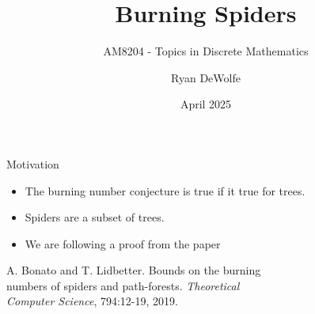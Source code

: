 \documentclass{beamer}
\title{Burning Spiders}
\subtitle{AM8204 - Topics in Discrete Mathematics}
\author{Ryan DeWolfe}
\institute{Toronto Metropolitan University}
\date{April 2025}
\begin{document}
\begin{frame}[plain]
    \titlepage
   \end{frame}

\begin{frame}{Motivation}
\begin{itemize}
\item The burning number conjecture is true if it true for trees.
\item Spiders are a subset of trees.
\item We are following a proof from the paper
\end{itemize}
\hspace{0.7cm} A. Bonato and T. Lidbetter. Bounds on the burning\\
\hspace{0.7cm} numbers of spiders and path-forests. \textit{Theoretical \\
\hspace{0.7cm} Computer Science}, 794:12-19, 2019.
\end{frame}
\end{document}
